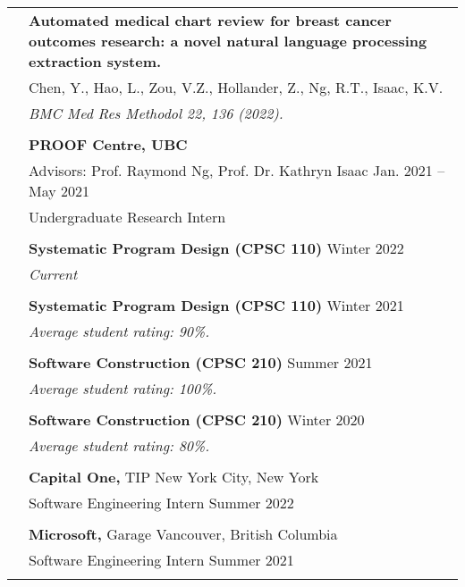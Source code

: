 \documentclass[letterpaper, 11pt]{article}
\begin{document}
\begin{longtable}{p{1.3in}p{4.8in}}
\nohyphens{\color{Blue}{Publications}} 
& \textbf{Automated medical chart review for breast cancer outcomes research: a novel natural language processing extraction system.} \\
& Chen, Y., Hao, L., Zou, V.Z., Hollander, Z., Ng, R.T., Isaac, K.V. \\
& \textit{BMC Med Res Methodol 22, 136 (2022).} \\
& \\

\nohyphens{\color{Blue}{Research Experience}} 
& \textbf{PROOF Centre, UBC} \\
& Advisors: Prof. Raymond Ng, Prof. Dr. Kathryn Isaac \hfill Jan. 2021 -- May 2021 \\
& Undergraduate Research Intern \\
& \\

{\color{Blue}{Teaching Experience}} 
& \textbf{Systematic Program Design (CPSC 110)} \hfill Winter 2022 \\
& \textit{Current} \\
& \\

& \textbf{Systematic Program Design (CPSC 110)} \hfill Winter 2021 \\
& \textit{Average student rating: 90\%.} \\
& \\

& \textbf{Software Construction (CPSC 210)} \hfill Summer 2021 \\
& \textit{Average student rating: 100\%.} \\
& \\

& \textbf{Software Construction (CPSC 210)} \hfill Winter 2020 \\
& \textit{Average student rating: 80\%.} \\
& \\


{\color{Blue}{Industry Experience}} 
& {\textbf{Capital One,}} TIP \hfill New York City, New York\\
& Software Engineering Intern \hfill Summer 2022 \\
& \\
 
& {\textbf{Microsoft,}} Garage \hfill Vancouver, British Columbia\\
& Software Engineering Intern \hfill Summer 2021 \\
& \\


\end{longtable}
\end{document}
